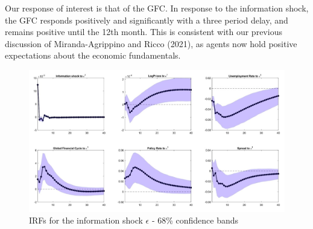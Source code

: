 \documentclass[11pt,a4paper]{article}
\begin{document}
Our response of interest is that of the GFC. 
In response to the information shock, the GFC responds positively and significantly with a three period delay, and remains positive until the 12th month. This is consistent with our previous discussion of Miranda-Agrippino and Ricco (2021), as agents now hold positive expectations about the economic fundamentals. 


    \begin{figure}
        \centering
        \includegraphics[scale=.39]{Graphs/IRF68_3lags.jpeg}
        \caption{IRFs for the information shock $\epsilon$ - 68\% confidence bands}
        \label{fig:IRF68}
    \end{figure}
\end{document}
